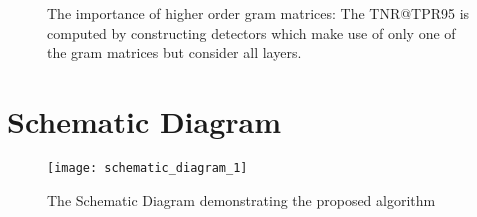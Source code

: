 \documentclass{article}
\begin{document}
\begin{figure}[H]
\begin{subfigure}{0.49\linewidth}
{
    }

    \label{fig:sfig4}
\end{subfigure}
    \caption{ The importance of higher order gram matrices: The TNR@TPR95 is computed by constructing detectors which make use of only one of the gram matrices but consider all layers.}
    \label{fig:ood_orders}
\end{figure}







\newpage

\appendix

\section{Schematic Diagram}
\label{app:schematic}
\begin{figure}[H]
    \centering
    \texttt{[image: schematic\_diagram\_1]}
    \caption{The Schematic Diagram demonstrating the proposed algorithm}
    \label{fig:schematic}
\end{figure}
\end{document}
